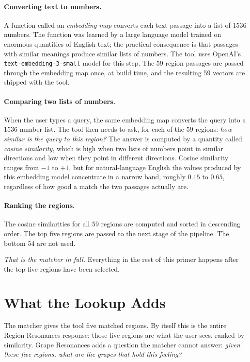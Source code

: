\documentclass[11pt]{article}
\begin{document}
\paragraph{Converting text to numbers.}
A function called an \emph{embedding map} converts each text passage into a list of 1536 numbers. The function was learned by a large language model trained on enormous quantities of English text; the practical consequence is that passages with similar meanings produce similar lists of numbers. The tool uses OpenAI's \texttt{text-embedding-3-small} model for this step. The 59 region passages are passed through the embedding map once, at build time, and the resulting 59 vectors are shipped with the tool.

\paragraph{Comparing two lists of numbers.}
When the user types a query, the same embedding map converts the query into a 1536-number list. The tool then needs to ask, for each of the 59 regions: \emph{how similar is the query to this region?} The answer is computed by a quantity called \emph{cosine similarity}, which is high when two lists of numbers point in similar directions and low when they point in different directions. Cosine similarity ranges from $-1$ to $+1$, but for natural-language English the values produced by this embedding model concentrate in a narrow band, roughly $0.15$ to $0.65$, regardless of how good a match the two passages actually are.

\paragraph{Ranking the regions.}
The cosine similarities for all 59 regions are computed and sorted in descending order. The top five regions are passed to the next stage of the pipeline. The bottom 54 are not used.

\medskip
\noindent\emph{That is the matcher in full.} Everything in the rest of this primer happens after the top five regions have been selected.

\section{What the Lookup Adds}

The matcher gives the tool five matched regions. By itself this is the entire Region Resonances response: those five regions are what the user sees, ranked by similarity. Grape Resonances adds a question the matcher cannot answer: \emph{given these five regions, what are the grapes that hold this feeling?}
\end{document}
